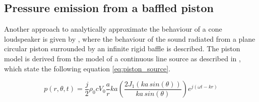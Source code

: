 \subsection{Pressure emission from a baffled piston}\label{ssec:piston}
Another  approach to analytically approximate the behaviour of a cone loudspeaker is given by \citep[p. 179 ff.]{Kinsler2000}, where the behaviour of the sound radiated from a plane circular piston surrounded by an infinite rigid baffle is described. The piston model is derived from the model of a continuous line source as described in \citep[p. 176 f.]{Kinsler2000}, which state the following equation \autoref{eq:piston_source}.



\begin{equation}\label{eq:piston_source}
p(r,\theta ,t)=\frac{j}{2} \rho_{0}c  V_{0}\frac{a}{r}ka \left ( \frac{2J_1(ka\, sin(\theta ))}{ka\, sin(\theta )} \right )e^{j(\omega t-kr)}
\end{equation}
\startexplain
\stopexplain


